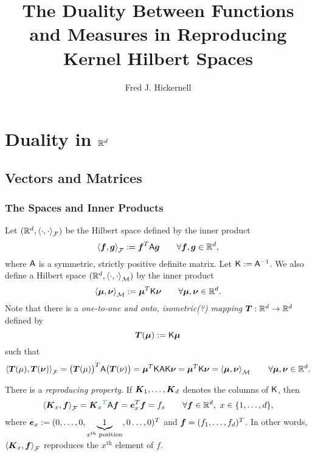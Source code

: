\documentclass[reqno]{amsart}
\newcommand{\AGSNote}[1]{{\color{cyan} #1}}
\begin{document}
\title{The Duality Between Functions and Measures in Reproducing Kernel Hilbert Spaces}
\author{Fred J. Hickernell}


\maketitle

\section{Duality in $\reals^d$}

\subsection{Vectors and Matrices}

\subsubsection{The Spaces and Inner Products}

Let $(\reals^d,\ip[\cf]{\cdot}{\cdot})$ be the Hilbert space defined by the inner product 
\begin{equation*}
    \ip[\cf]{\vf}{\vg} := \vf^T \mA \vg \qquad \forall \vf, \vg \in \reals^d,
\end{equation*}
where $\mA$ is a symmetric, strictly positive definite matrix.  Let $\mK :=  \mA^{-1}$.  We also define a Hilbert space $(\reals^d,\ip[\cm]{\cdot}{\cdot})$ by the inner product
\begin{equation*}
    \ip[\cm]{\vmu}{\vnu} := \vmu^T \mK \vnu \qquad \forall \vmu, \vnu \in \reals^d.
\end{equation*}
Note that there is a \emph{one-to-one and onto, isometric(?) mapping} $\vT: \reals^d \to \reals^d$ defined by 
\[
\vT(\vmu) := \mK \vmu
\]
such that 
\begin{equation*}
    \ip[\cf]{\vT(\mu)}{\vT(\vnu)} = \bigl(\vT(\mu)\bigr)^T \mA \bigl(\vT(\nu)\bigr) = \vmu^T \mK \mA \mK \vnu = \vmu^T \mK \vnu = \ip[\cm]{\vmu}{\vnu} \qquad \forall \vmu, \vnu \in \reals^d.
\end{equation*}

There is a \emph{reproducing property}.  If $\vK_1, \ldots, \vK_d$ denotes the columns of $\mK$, then
\begin{equation*}
    \ip[\cf]{\vK_x}{\vf} = \vK_x\AGSNote{^T} \mA \vf = \ve_x^T \vf = f_x \qquad \forall \vf \in \reals^d, \ x \in \{1, \ldots, d\},
\end{equation*}
where $\ve_x := (0, \ldots, 0,\underbrace{1}_{x^{\text{th}} \text{ position}}, 0 \ldots, 0)^T$ and $\vf = (f_1, \ldots, f_d)^T$.  In other words, $ \ip[\cf]{\vK_x}{\vf}$ reproduces the $x^{\text{th}}$ element of $f$.
\end{document}
